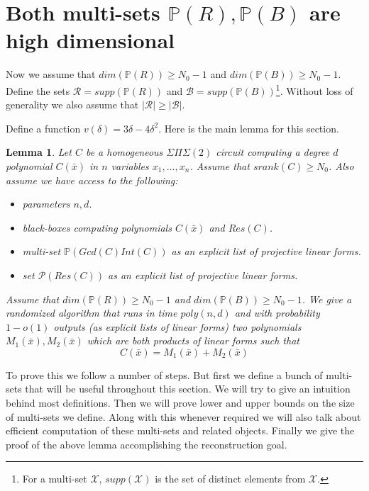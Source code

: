 \documentclass[12pt]{caltech_thesis}
\theoremstyle{plain}
\newtheorem{lemma}{Lemma}
\theoremstyle{definition}
\newcommand{\MB}{\mathcal{B}}
\newcommand{\MP}{\mathcal{P}}
\newcommand{\MR}{\mathcal{R}}
\newcommand{\MX}{\mathcal{X}}
\newcommand{\PP}{\mathbb{P}}
\newcommand{\B}[1]{\bar{#1}}
\begin{document}
 
 
\section{Both multi-sets $\PP(R),\PP(B)$ are high dimensional}\label{subsection:generalcase}
Now we assume that $dim(\PP(R))\geq N_0-1$ and $dim(\PP(B))\geq N_0-1$. 
Define the sets $\MR = supp(\PP(R))$ and $\MB = supp(\PP(B))$\footnote{ For a multi-set $\MX$, $supp(\MX)$
is the set of distinct elements from $\MX$. }.  Without loss of generality we also assume that
$|\MR|\geq |\MB|$. 

 Define a function $v(\delta) = 3\delta-4\delta^2$.
Here is the main lemma for this section.

 \begin{lemma}\label{lemma:mainlemma}
 Let $C$ be a homogeneous $\Sigma\Pi\Sigma(2)$ circuit computing a degree $d$ polynomial $C(\B{x})$ in $n$ variables $x_1,\ldots,x_n$. 
Assume that $srank(C)\geq N_0$. Also assume we have access to the following:
\begin{itemize}
\renewcommand\labelitemi{--}
\item parameters $n,d$.
 \item black-boxes computing polynomials $C(\B{x})$ and $Res(C)$.
 \item multi-set $\PP(Gcd(C)Int(C))$ as an explicit list of projective linear forms.
 \item set $\MP(Res(C))$ as an explicit list of projective linear forms.
\end{itemize}
Assume that $dim(\PP(R)) \geq N_0-1$ and $dim(\PP(B))\geq N_0-1$. We give a randomized algorithm that runs in time $poly(n,d)$ and with probability 
$1-o(1)$ outputs (as explicit lists of linear forms) two polynomials
$M_1(\B{x}), M_2(\B{x})$ which are both products of linear forms such that
\[
 C(\B{x}) = M_1(\B{x}) + M_2(\B{x})
\]
 \end{lemma}

To prove this we follow a number of steps. But first we define a bunch of multi-sets that will be useful throughout this section. We will try to give an intuition behind most
definitions. Then we will prove lower and upper bounds on the size of multi-sets we define. Along with this whenever required
we will also talk about efficient computation of these multi-sets and related objects. Finally we give the proof of the above lemma
accomplishing the reconstruction goal.
\end{document}
